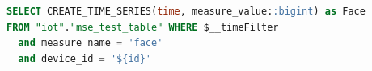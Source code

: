 \begin{lstlisting}[language=SQL, label=cod:grafana_sql,caption=Código SQL para obtener datos de Tiemstream en Grafana.]
SELECT CREATE_TIME_SERIES(time, measure_value::bigint) as Face
FROM "iot"."mse_test_table" WHERE $__timeFilter
  and measure_name = 'face'
  and device_id = '${id}'
\end{lstlisting}